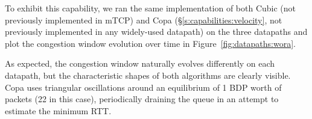 To exhibit this capability, we ran the same implementation of both Cubic (not previously implemented in mTCP) and Copa (\S\ref{s:capabilities:velocity}, not previously implemented in any widely-used datapath) on the three datapaths and plot the congestion window evolution over time in Figure~\ref{fig:datapaths:wora}.

As expected, the congestion window naturally evolves differently on each datapath, but the characteristic shapes of both algorithms are clearly visible. Copa uses triangular oscillations around an equilibrium of 1 BDP worth of packets (22 in this case), periodically draining the queue in an attempt to estimate the minimum RTT.